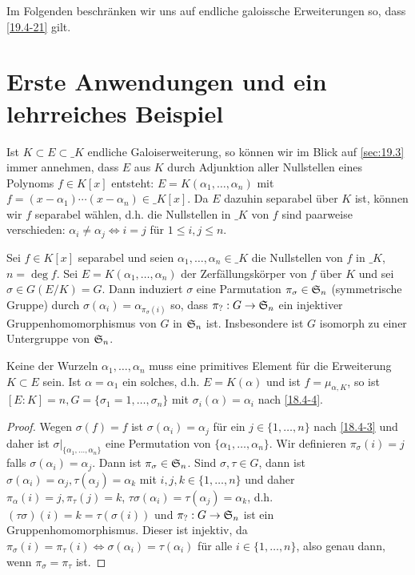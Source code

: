 Im Folgenden beschränken wir uns auf endliche galoissche Erweiterungen so, dass \ref{19.4-21} gilt.


\section{Erste Anwendungen und ein lehrreiches Beispiel}


Ist $K \subset E \subset \_K$ endliche Galoiserweiterung, so können wir im Blick auf \ref{sec:19.3} immer annehmen, dass $E$ aus $K$ durch Adjunktion aller Nullstellen eines Polynoms $f \in K[x]$ entsteht: $E = K(\alpha_1, \dotsc, \alpha_n)$ mit $f = (x-\alpha_1) \dotsb (x-\alpha_n) \in \_K[x]$.
Da $E$ dazuhin separabel über $K$ ist, können wir $f$ separabel wählen, d.h. die Nullstellen in $\_K$ von $f$ sind paarweise verschieden: $\alpha_i \neq \alpha_j \iff i = j$ für $1 \le i,j \le n$.

\begin{st} \label{19.5-1}
	Sei $f \in K[x]$ separabel und seien $\alpha_1, \dotsc, \alpha_n \in \_K$ die Nullstellen von $f$ in $\_K$, $n = \deg f$.
	Sei $E = K(\alpha_1, \dotsc, \alpha_n)$ der Zerfällungskörper von $f$ über $K$ und sei $\sigma \in G(E / K) = G$.
	Dann induziert $\sigma$ eine Parmutation $\pi_\sigma \in \S_n$ (symmetrische Gruppe) durch $\sigma(\alpha_i) = \alpha_{\pi_\sigma(i)}$ so, dass $\pi_?: G \to \S_n$ ein injektiver Gruppenhomomorphismus von $G$ in $\S_n$ ist.
	Insbesondere ist $G$ isomorph zu einer Untergruppe von $\S_n$.
	\begin{note}
		Keine der Wurzeln $\alpha_1, \dotsc, \alpha_n$ muss eine primitives Element für die Erweiterung $K \subset E$ sein.
		Ist $\alpha = \alpha_1$ ein solches, d.h. $E = K(\alpha)$ und ist $f = \mu_{\alpha, K}$, so ist $[E : K] = n, G = \{ \sigma_1 = 1, \dotsc, \sigma_n \}$ mit $\sigma_i(\alpha) = \alpha_i$ nach \ref{18.4-4}.
	\end{note}
	\begin{proof}
		Wegen $\sigma(f) = f$ ist $\sigma(\alpha_i) = \alpha_j $ für ein $j \in \{1, \dotsc, n\}$ nach \ref{18.4-3} und daher ist $\sigma|_{\{\alpha_1, \dotsc, \alpha_n\}}$ eine Permutation von $\{\alpha_1, \dotsc, \alpha_n\}$.
		Wir definieren $\pi_\sigma(i) = j$ falls $\sigma(\alpha_i) = \alpha_j$.
		Dann ist $\pi_\sigma \in \S_n$.
		Sind $\sigma, \tau \in G$, dann ist $\sigma(\alpha_i) = \alpha_j, \tau(\alpha_j) = \alpha_k$ mit $i,j,k \in \{1, \dotsc, n\}$ und daher $\pi_\alpha(i) = j, \pi_\tau(j) = k$, $\tau \sigma(\alpha_i) = \tau(\alpha_j) = \alpha_k$, d.h. $(\tau\sigma)(i) = k = \tau(\sigma(i))$ und $\pi_?: G \to \S_n$ ist ein Gruppenhomomorphismus.
		Dieser ist injektiv, da $\pi_\sigma(i) = \pi_\tau(i) \iff \sigma(\alpha_i) = \tau(\alpha_i)$ für alle $i \in \{1, \dotsc, n\}$, also genau dann, wenn $\pi_\sigma = \pi_\tau$ ist.
	\end{proof}
\end{st}

